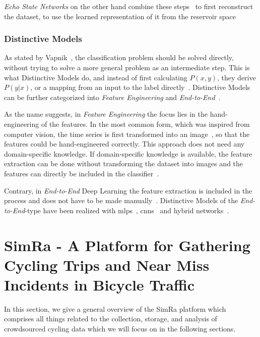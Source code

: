\textit{Echo State Networks} on the other hand combine these steps~\cite{jaeger2001echo} to first reconstruct the dataset, to use the learned representation of it from the reservoir space~\cite{aswolinskiy2018time,bianchi2020reservoir,chouikhi2018genesis,ma2016functional}

\subsubsection*{Distinctive Models}
As stated by Vapnik~\cite{vapnik1998statistical}, the classification problem should be solved directly, without trying to solve a more general problem as an intermediate step.
This is what Distinctive Models do, and instead of first calculating $P(x,y)$, they derive $P(y|x)$, or a mapping from an input to the label directly~\cite{ng2001discriminative}.
Distinctive Models can be further categorized into \textit{Feature Engineering} and \textit{End-to-End}~\cite{ismail2019deep}.

As the name suggests, in \textit{Feature Engineering} the focus lies in the hand-engineering of the features.
In the most common form, which was inspired from computer vision, the time series is first transformed into an image~\cite{wang2015encoding,hatami2018classification,tripathy2018use}, so that the features could be hand-engineered correctly.
This approach does not need any domain-specific knowledge.
If domain-specific knowledge is available, the feature extraction can be done without transforming the dataset into images and the features can directly be included in the classifier~\cite{uemura2018feasibility,ignatov2018real}.

Contrary, in \textit{End-to-End} Deep Learning the feature extraction is included in the process and does not have to be made manually~\cite{nweke2018deep}.
Distinctive Models of the \textit{End-to-End}-type have been realized with \acp{mlp}~\cite{wang2017time,geng2019cost}, \acp{cnn}~\cite{che2017boosting,ismail2018evaluating,liu2018time} and hybrid networks~\cite{lin2017gcrnn,serra2018towards}.


\section{SimRa - A Platform for Gathering Cycling Trips and Near Miss Incidents in Bicycle Traffic}
\label{sec:simra}
In this section, we give a general overview of the SimRa platform which comprises all things related to the collection, storage, and analysis of crowdsourced cycling data which we will focus on in the following sections.

